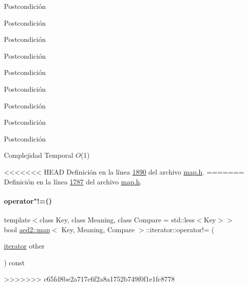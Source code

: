 \begin{Indent}
\begin{DoxyPostcond}{\-Postcondición}
\begin{DoxyPostcond}{\-Postcondición}
\begin{DoxyPostcond}{\-Postcondición}
\begin{DoxyPostcond}{\-Postcondición}
\begin{DoxyPostcond}{\-Postcondición}
\begin{DoxyPostcond}{\-Postcondición}
\begin{DoxyPostcond}{\-Postcondición}
\begin{DoxyPostcond}{\-Postcondición}
\begin{DoxyPostcond}{\-Postcondición}
\begin{DoxyDescription}
\item[\-Complejidad \-Temporal]$O$(1)
\end{DoxyDescription}

<<<<<<< HEAD
\-Definición en la línea \hyperlink{map_8h_source_l01890}{1890} del archivo \hyperlink{map_8h_source}{map.\-h}.
=======
Definición en la línea \hyperlink{map_8h_source_l01787}{1787} del archivo \hyperlink{map_8h_source}{map.\+h}.

\mbox{\label{classaed2_1_1map_1_1iterator_a748cdf8c35707d1c2e9ef8ef9d862d37_a748cdf8c35707d1c2e9ef8ef9d862d37}} 
\paragraph{\texorpdfstring{operator"!=()}{operator!=()}}
{\footnotesize\ttfamily template$<$class Key, class Meaning, class Compare = std\+::less$<$\+Key$>$$>$ \\
bool \hyperlink{classaed2_1_1map}{aed2\+::map}$<$ Key, Meaning, Compare $>$\+::iterator\+::operator!= (\begin{DoxyParamCaption}\item[{\hyperlink{classaed2_1_1map_1_1iterator}{iterator}}]{other }\end{DoxyParamCaption}) const\hspace{0.3cm}{\ttfamily [inline]}}
>>>>>>> c65fd8be2a717c6f2a8a1752b749f0f1e1fc8778

\hypertarget{classaed2_1_1map_1_1iterator_a836c7a166d63f507c4f79085ae953c51_a836c7a166d63f507c4f79085ae953c51}{
}
\end{DoxyPostcond}
\end{DoxyPostcond}
\end{DoxyPostcond}
\end{DoxyPostcond}
\end{DoxyPostcond}
\end{DoxyPostcond}
\end{DoxyPostcond}
\end{DoxyPostcond}
\end{DoxyPostcond}
\end{Indent}
